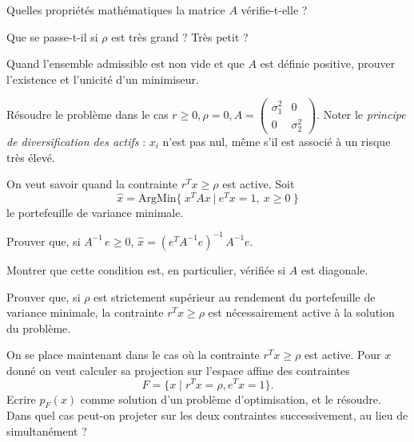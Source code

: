 \documentclass[10pt,a4paper,fleqn]{report}
\begin{document}
\begin{exercice}
\begin{questions}
\item Quelles propriétés mathématiques la matrice $A$ vérifie-t-elle ?
\item Que se passe-t-il si $\rho$ est très grand ? Très petit ?
\item Quand l'ensemble admissible est non vide et que $A$ est
      d\'efinie positive, prouver l'existence et l'unicit\'e d'un minimiseur.
\item Résoudre le problème dans le cas $r \geq 0, \rho = 0, A =
  \begin{pmatrix}
    \sigma_{1}^{2}&0\\0&\sigma_{2}^{2}
  \end{pmatrix}$. Noter le \textit{principe de diversification des
    actifs} : $x_{i}$ n'est pas nul, même s'il est associé à un risque
  très élevé.
\end{questions}
\end{exercice}

\begin{exercice}
  On veut savoir quand la contrainte $r^{T} x \geq \rho$ est
  active. Soit $$\hat x= \mathrm{ArgMin} \{\ x^{T} A x\ |\ e^{T} x=1, \
  x\geq 0\ \}$$ le portefeuille de variance minimale.
\begin{questions}
\item Prouver que, si $A^{-1}\,e\geq 0$, $\hat x=(e^{T} A^{-1} e)^{-1}\,A^{-1}e$.
\item Montrer que cette condition est, en particulier, v\'erifi\'ee si $A$ est diagonale.
\item Prouver que, si $\rho$ est strictement sup\'erieur au rendement du portefeuille de variance minimale, la contrainte $r^{T} x \geq \rho$ est n\'ecessairement active \`a la solution du probl\`eme.
\end{questions}
\end{exercice}

\begin{exercice}[(projection)]
  On se place maintenant dans le cas où la contrainte $r^{T} x \geq \rho$
  est active.
  Pour $x$ donn\'e on veut calculer sa projection sur l'espace affine
  des contraintes
  \[F = \{x \; | \; r^{T} x = \rho, e^{T} x = 1\}.\]
  Ecrire $p_F(x)$ comme solution d'un problème d'optimisation, et le r\'esoudre.
  Dans quel cas peut-on projeter sur les deux
  contraintes successivement, au lieu de simultanément ?
\end{exercice}
\end{document}

